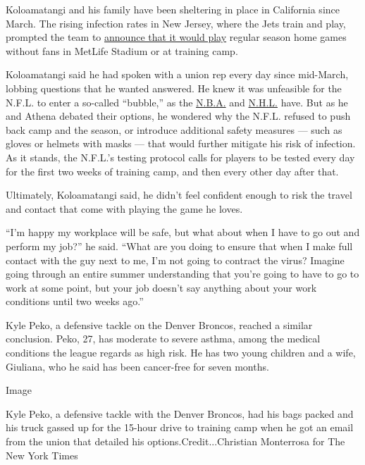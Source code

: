 Koloamatangi and his family have been sheltering in place in California
since March. The rising infection rates in New Jersey, where the Jets
train and play, prompted the team to
\href{https://www.nytimes3xbfgragh.onion/2020/07/20/sports/football/jets-giants-rutgers-fans-metlife-stadium.html}{announce
that it would play} regular season home games without fans in MetLife
Stadium or at training camp.

Koloamatangi said he had spoken with a union rep every day since
mid-March, lobbing questions that he wanted answered. He knew it was
unfeasible for the N.F.L. to enter a so-called ``bubble,'' as the
\href{https://www.nytimes3xbfgragh.onion/2020/07/22/sports/basketball/nba-bubble-practice.html}{N.B.A.}
and
\href{https://www.nytimes3xbfgragh.onion/2020/07/06/sports/hockey/nhl-playoffs.html}{N.H.L.}
have. But as he and Athena debated their options, he wondered why the
N.F.L. refused to push back camp and the season, or introduce additional
safety measures --- such as gloves or helmets with masks --- that would
further mitigate his risk of infection. As it stands, the N.F.L.'s
testing protocol calls for players to be tested every day for the first
two weeks of training camp, and then every other day after that.

Ultimately, Koloamatangi said, he didn't feel confident enough to risk
the travel and contact that come with playing the game he loves.

``I'm happy my workplace will be safe, but what about when I have to go
out and perform my job?'' he said. ``What are you doing to ensure that
when I make full contact with the guy next to me, I'm not going to
contract the virus? Imagine going through an entire summer understanding
that you're going to have to go to work at some point, but your job
doesn't say anything about your work conditions until two weeks ago.''

Kyle Peko, a defensive tackle on the Denver Broncos, reached a similar
conclusion. Peko, 27, has moderate to severe asthma, among the medical
conditions the league regards as high risk. He has two young children
and a wife, Giuliana, who he said has been cancer-free for seven months.

Image

Kyle Peko, a defensive tackle with the Denver Broncos, had his bags
packed and his truck gassed up for the 15-hour drive to training camp
when he got an email from the union that detailed his
options.Credit...Christian Monterrosa for The New York Times

